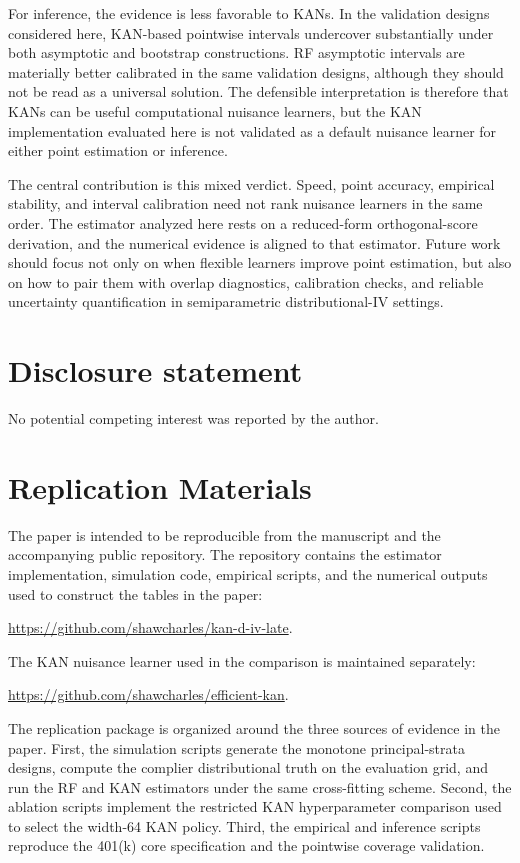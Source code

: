 \documentclass[final,3p,fleqn, 10pt]{elsarticle}
\begin{document}
For inference, the evidence is less favorable to KANs. In the validation designs considered here, KAN-based pointwise intervals undercover substantially under both asymptotic and bootstrap constructions. RF asymptotic intervals are materially better calibrated in the same validation designs, although they should not be read as a universal solution. The defensible interpretation is therefore that KANs can be useful computational nuisance learners, but the KAN implementation evaluated here is not validated as a default nuisance learner for either point estimation or inference.

The central contribution is this mixed verdict. Speed, point accuracy, empirical stability, and interval calibration need not rank nuisance learners in the same order. The estimator analyzed here rests on a reduced-form orthogonal-score derivation, and the numerical evidence is aligned to that estimator. Future work should focus not only on when flexible learners improve point estimation, but also on how to pair them with overlap diagnostics, calibration checks, and reliable uncertainty quantification in semiparametric distributional-IV settings.

\section*{Disclosure statement}

No potential competing interest was reported by the author.


\appendix
\section{Replication Materials}
\label{app:replication_materials}

The paper is intended to be reproducible from the manuscript and the accompanying public repository. The repository contains the estimator implementation, simulation code, empirical scripts, and the numerical outputs used to construct the tables in the paper:
\begin{center}
\url{https://github.com/shawcharles/kan-d-iv-late}.
\end{center}
The KAN nuisance learner used in the comparison is maintained separately:
\begin{center}
\url{https://github.com/shawcharles/efficient-kan}.
\end{center}

The replication package is organized around the three sources of evidence in the paper. First, the simulation scripts generate the monotone principal-strata designs, compute the complier distributional truth on the evaluation grid, and run the RF and KAN estimators under the same cross-fitting scheme. Second, the ablation scripts implement the restricted KAN hyperparameter comparison used to select the width-64 KAN policy. Third, the empirical and inference scripts reproduce the 401(k) core specification and the pointwise coverage validation.
\end{document}
